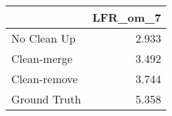 \begin{tabular}{lr}
\toprule
{} & LFR_om_7 \\
\midrule
No Clean Up  &    2.933 \\
Clean-merge  &    3.492 \\
Clean-remove &    3.744 \\
Ground Truth &    5.358 \\
\bottomrule
\end{tabular}
